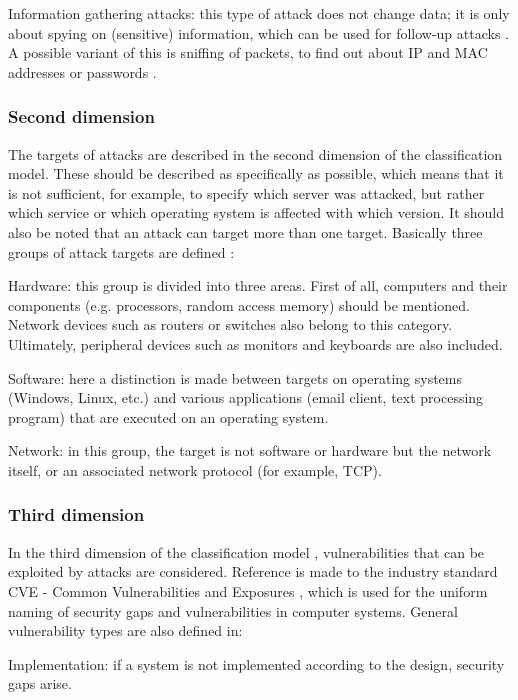 \documentclass[conference]{IEEEtran}
\begin{document}
\smallskip Information gathering attacks: this type of attack does not change data; it is only about spying on (sensitive) information, which can be used for follow-up attacks \cite{b5}. A possible variant of this is sniffing of packets, to find out about IP and MAC addresses or passwords \cite{b2}.

\medskip \subsubsection{Second dimension}The targets of attacks are described in the second dimension of the classification model. These should be described as specifically as possible, which means that it is not sufficient, for example, to specify which server was attacked, but rather which service or which operating system is affected with which version. It should also be noted that an attack can target more than one target. Basically three groups of attack targets are defined \cite{b5}:

\smallskip Hardware: this group is divided into three areas. First of all, computers and their components (e.g. processors, random access memory) should be mentioned. Network devices such as routers or switches also belong to this category. Ultimately, peripheral devices such as monitors and keyboards are also included.

\smallskip Software: here a distinction is made between targets on operating systems (Windows, Linux, etc.) and various applications (email client, text processing program) that are executed on an operating system.

\smallskip Network: in this group, the target is not software or hardware but the network itself, or an associated network protocol (for example, TCP).

\medskip \subsubsection{Third dimension}In the third dimension of the classification model \cite{b5}, vulnerabilities that can be exploited by attacks are considered. Reference is made to the industry standard CVE - Common Vulnerabilities and Exposures \cite{b7}, which is used for the uniform naming of security gaps and vulnerabilities in computer systems. General vulnerability types are also defined in\cite{b8}:

\smallskip Implementation: if a system is not implemented according to the design, security gaps arise.
\end{document}
